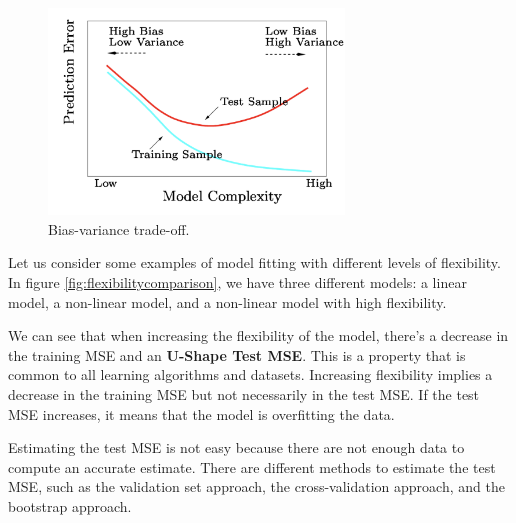 \begin{figure}[H]
    \centering
    \includegraphics[width=0.7\textwidth]{./figures/intro/biasvariancetradeoff.png}
    \caption{Bias-variance trade-off.}
    \label{fig:biasvariancetradeoff}
\end{figure}

Let us consider some examples of model fitting with different levels of flexibility. In figure \ref*{fig:flexibilitycomparison}, we have three different models: a linear model, a non-linear model, and a non-linear model with high flexibility. 

We can see that when increasing the flexibility of the model, there's a decrease in the training MSE and an \textbf{U-Shape Test MSE}. This is a property that is common to all learning algorithms and datasets. Increasing flexibility implies a decrease in the training MSE but not necessarily in the test MSE. If the test MSE increases, it means that the model is overfitting the data.

Estimating the test MSE is not easy because there are not enough data to compute an accurate estimate. There are different methods to estimate the test MSE, such as the validation set approach, the cross-validation approach, and the bootstrap approach.

